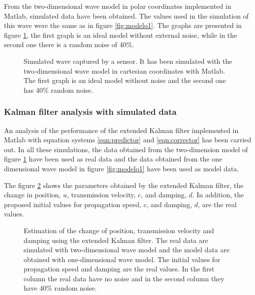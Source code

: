 \documentclass[12pt, a4paper]{article} %
\begin{document}
\setlength{\parskip}{0mm}

From the two-dimensional wave model in polar coordinates implemented in Matlab, simulated data have been obtained. The values used in the simulation of this wave were the same as in figure \ref{fig:modelo1}. The graphs are presented in figure \ref{fig:modelo2}, the first graph is an ideal model without external noise, while in the second one there is a random noise of 40\%.

\setlength{\parskip}{4mm}

\begin{figure}[h!]
    \centering
    
    \caption{Simulated wave captured by a sensor. It has been simulated with the two-dimensional wave model in cartesian coordinates with Matlab. The first graph is an ideal model without noise and the second one has 40\% random noise.}
    \label{fig:modelo2}
\end{figure}

\newpage
\subsubsection{Kalman filter analysis with simulated data}

\setlength{\parskip}{0mm}

An analysis of the performance of the extended Kalman filter implemented in Matlab with equation systems \ref{eqn:predictor} and \ref{eqn:corrector} has been carried out. In all these simulations, the data obtained from the two-dimension model of figure \ref{fig:modelo2} have been used as real data and the data obtained from the one dimensional wave model in figure \ref{fig:modelo1} have been used as model data.

\setlength{\parskip}{4mm}

The figure \ref{fig:kalman1} shows the parameters obtained by the extended Kalman filter, the change in position, $u$, transmission velocity, $c$, and damping, $d$. In addition, the proposed initial values for propagation speed, $c$, and damping, $d$, are the real values.

\begin{figure}[h!]
    \centering
    
    \caption{Estimation of the change of position, transmission velocity and damping using the extended Kalman filter. The real data are simulated with two-dimensional wave model and the model data are obtained with one-dimensional wave model. The initial values for propagation speed and damping are the real values. In the first column the real data have no noise and in the second column they have 40\% random noise.}
    \label{fig:kalman1}
\end{figure}
\end{document}
